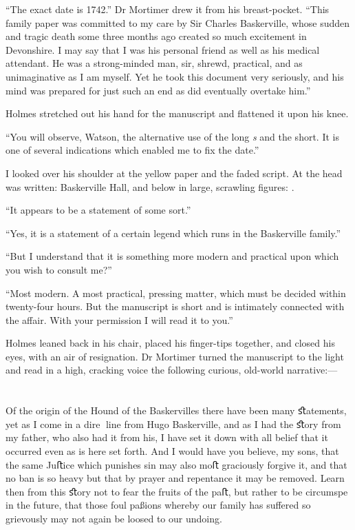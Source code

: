 \documentclass[paper=a5,BCOR=7mm,twoside,DIV=calc,12pt,usegeometry,openany,chapterprefix,endperiod,headings=big]{scrbook} %
\begin{document}
\enquote{The exact date is 1742.} Dr Mortimer drew it from his breast-pocket. \enquote{This family paper was committed to my care by Sir Charles Baskerville, whose sudden and tragic death some three months ago created so much excitement in Devonshire. I may say that I was his personal friend as well as his medical attendant. He was a strong-minded man, sir, shrewd, practical, and as unimaginative as I am myself. Yet he took this document very seriously, and his mind was prepared for just such an end as did eventually overtake him.}

Holmes stretched out his hand for the manuscript and flattened it upon his knee.

\enquote{You will observe, Watson, the alternative use of the long \textit{s} and the short. It is one of several indications which enabled me to fix the date.}

I looked over his shoulder at the yellow paper and the faded script. At the head was written: \oldfont Baskerville Hall\normalfont, and below in large, scrawling figures: . \normalfont

\enquote{It appears to be a statement of some sort.}

\enquote{Yes, it is a statement of a certain legend which runs in the Baskerville family.}

\enquote{But I understand that it is something more modern and practical upon which you wish to consult me?}

\enquote{Most modern. A most practical, pressing matter, which must be decided within twenty-four hours. But the manuscript is short and is intimately connected with the affair. With your permission I will read it to you.}

Holmes leaned back in his chair, placed his finger-tips together, and closed his eyes, with an air of resignation. Dr Mortimer turned the manuscript to the light and read in a high, cracking voice the following curious, old-world narrative:--- \\

~\\~\\

\oldfont
Of the origin of the Hound of the Baskervilles there have been many ﬆatements, yet as I come in a dire line from Hugo Baskerville, and as I had the ﬆory from my father, who also had it from his, I have set it down with all belief that it occurred even as is here set forth. And I would have you believe, my sons, that the same Juﬅice which punishes sin may also moﬅ graciously forgive it, and that no ban is so heavy but that by prayer and repentance it may be removed. Learn then from this ﬆory not to fear the fruits of the paﬅ, but rather to be circumspe in the future, that those foul paßions whereby our family has suﬀered so grievously may not again be loosed to our undoing.
\end{document}
